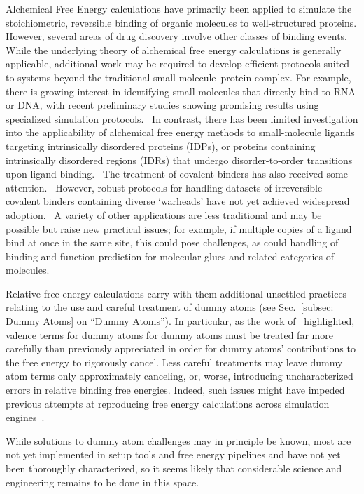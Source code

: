 \documentclass[9pt,bestpractices]{livecoms}
\begin{document}
Alchemical Free Energy calculations have primarily been applied to simulate the stoichiometric, reversible binding of organic molecules to well-structured proteins. However, several areas of drug discovery involve other classes of binding events. While the underlying theory of alchemical free energy calculations is generally applicable, additional work may be required to develop efficient protocols suited to systems beyond the traditional small molecule–protein complex.
For example, there is growing interest in identifying small molecules that directly bind to RNA or DNA, with recent preliminary studies showing promising results using specialized simulation protocols.~\cite{Abramyan2025,Rasouli2024} In contrast, there has been limited investigation into the applicability of alchemical free energy methods to small-molecule ligands targeting intrinsically disordered proteins (IDPs),\cite{Papadourakis2024} or proteins containing intrinsically disordered regions (IDRs) that undergo disorder-to-order transitions upon ligand binding.~\cite{MendozaMartinez2022, kalpokas2025accurate}
The treatment of covalent binders has also received some attention.~\cite{luo2021,zhang2019} However, robust protocols for handling datasets of irreversible covalent binders containing diverse ‘warheads’ have not yet achieved widespread adoption.~\cite{Yu2019} A variety of other applications are less traditional and may be possible but raise new practical issues; for example, if multiple copies of a ligand bind at once in the same site, this could pose challenges, as could handling of binding and function prediction for molecular glues and related categories of molecules. 

Relative free energy calculations carry with them additional unsettled practices relating to the use and careful treatment of dummy atoms (see Sec.~\ref{subsec: Dummy Atoms} on ``Dummy Atoms''). In particular, as the work of~\cite{Fleck_2021} highlighted, valence terms for dummy atoms for dummy atoms must be treated far more carefully than previously appreciated in order for dummy atoms' contributions to the free energy to rigorously cancel. Less careful treatments may leave dummy atom terms only approximately canceling, or, worse, introducing uncharacterized errors in relative binding free energies. Indeed, such issues might have impeded previous attempts at reproducing free energy calculations across simulation engines~\cite{loeffler2018reproducibility}. 

While solutions to dummy atom challenges may in principle be known, most are not yet implemented in setup tools and free energy pipelines and have not yet been thoroughly characterized, so it seems likely that considerable science and engineering remains to be done in this space. 
\end{document}
